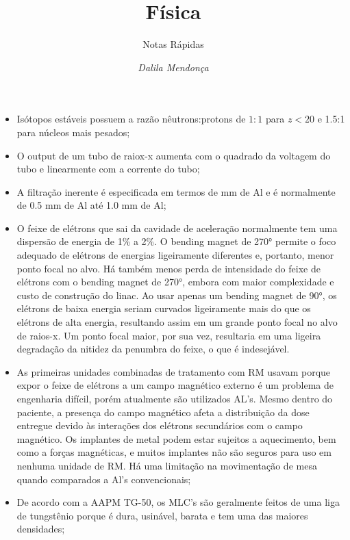 \documentclass[11pt,a4paper]{article}
\title{Física}
\author{Notas Rápidas \nocite{*}}
\date{\textit{Dalila Mendonça}}
\newcounter{exemplo}
\begin{document}
	\maketitle


\begin{exemplo}[Física]

    \begin{itemize}
        \item Isótopos estáveis possuem a razão nêutrons:protons de $1:1$ para $z <  20$ e 1.5:1 para núcleos mais pesados;
        
        \item O output de um tubo de raiox-x aumenta com o quadrado da voltagem do tubo  e linearmente com a corrente do tubo;
        
        \item A filtração inerente é especificada em termos de mm de Al e é normalmente de 0.5 mm de Al até 1.0 mm de Al;
        
        \item O feixe de elétrons que sai da cavidade de aceleração normalmente tem uma dispersão de energia de 1\% a 2\%. O bending magnet de \ang{270} permite o foco adequado de elétrons de energias ligeiramente diferentes e, portanto, menor ponto focal no alvo. Há também menos perda de intensidade do feixe de elétrons com o bending magnet de \ang{270}, embora com maior complexidade e custo de construção do linac. Ao usar apenas um bending magnet de \ang{90}, os elétrons de baixa energia seriam curvados ligeiramente mais do que os elétrons de alta energia, resultando assim em um grande ponto focal no alvo de raios-x. Um ponto focal maior, por sua vez, resultaria em uma ligeira degradação da nitidez da penumbra do feixe, o que é indesejável.
        
        \item As primeiras unidades combinadas de tratamento com RM usavam  porque expor o feixe de elétrons a um campo magnético externo é um problema de engenharia difícil, porém atualmente são utilizados AL's. Mesmo dentro do paciente, a presença do campo magnético afeta a distribuição da dose entregue devido às interações dos elétrons secundários com o campo magnético. Os implantes de metal podem estar sujeitos a aquecimento, bem como a forças magnéticas, e muitos implantes não são seguros para uso em nenhuma unidade de RM. Há uma limitação na movimentação de mesa quando comparados a Al's convencionais;
        
        \item De acordo com a AAPM TG-50, os MLC's são geralmente feitos de uma liga de tungstênio porque é dura, usinável, barata e tem uma das maiores densidades;
        

\end{itemize}
\end{exemplo}
\end{document}
